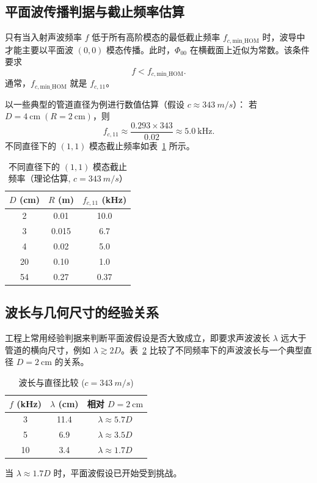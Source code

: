\documentclass[12pt,a4paper]{article}
\begin{document}
\subsection{平面波传播判据与截止频率估算}
只有当入射声波频率 $f$ 低于所有高阶模态的最低截止频率 $f_{c,\text{min\_HOM}}$ 时，波导中才能主要以平面波 $(0,0)$ 模态传播。此时，$\Phi_{00}$ 在横截面上近似为常数。该条件要求
\begin{equation}
    f < f_{c,\text{min\_HOM}}.
    \label{eq:planewave_criterion_freq}
\end{equation}
通常，$f_{c,\text{min\_HOM}}$ 就是 $f_{c,11}$。

以一些典型的管道直径为例进行数值估算（假设 $c \approx \SI{343}{m/s}$）：
若 $D=\SI{4}{\centi\meter}\; (R=\SI{2}{\centi\meter})$，则
\[
    f_{c,11}\approx\frac{0.293\times343}{0.02}\approx\SI{5.0}{\kilo\hertz}.
\]
不同直径下的 $(1,1)$ 模态截止频率如表~\ref{tab:fc} 所示。

\begin{table}[h]
    \centering
    \caption{不同直径下的 $(1,1)$ 模态截止频率（理论估算, $c=\SI{343}{m/s}$）}\label{tab:fc}
    \begin{tabular}{ccc}
        \toprule
        $D$ (\si{\centi\meter}) & $R$ (\si{\meter}) & $f_{c,11}$ (\si{\kilo\hertz}) \\
        \midrule
        2 & 0.01 & 10.0 \\
        3 & 0.015 & 6.7 \\
        4 & 0.02 & 5.0 \\
        20 & 0.10 & 1.0 \\
        54 & 0.27 & 0.37 \\
        \bottomrule
    \end{tabular}
\end{table}

\subsection{波长与几何尺寸的经验关系}
工程上常用经验判据来判断平面波假设是否大致成立，即要求声波波长 $\lambda$ 远大于管道的横向尺寸，例如 $\lambda \gtrsim 2D$。表~\ref{tab:lambda} 比较了不同频率下的声波波长与一个典型直径 $D=\SI{2}{\centi\meter}$ 的关系。

\begin{table}[h]
    \centering
    \caption{波长与直径比较 ($c=\SI{343}{m/s}$)}\label{tab:lambda}
    \begin{tabular}{ccc}
        \toprule
        $f$ (\si{\kilo\hertz}) & $\lambda$ (\si{\centi\meter}) & 相对 $D=\SI{2}{\centi\meter}$ \\
        \midrule
        3  & 11.4 & $\lambda \approx 5.7D$ \\
        5  & 6.9  & $\lambda \approx 3.5D$ \\
        10 & 3.4  & $\lambda \approx 1.7D$ \\
        \bottomrule
    \end{tabular}
\end{table}
当 $\lambda \approx 1.7D$ 时，平面波假设已开始受到挑战。
\end{document}
